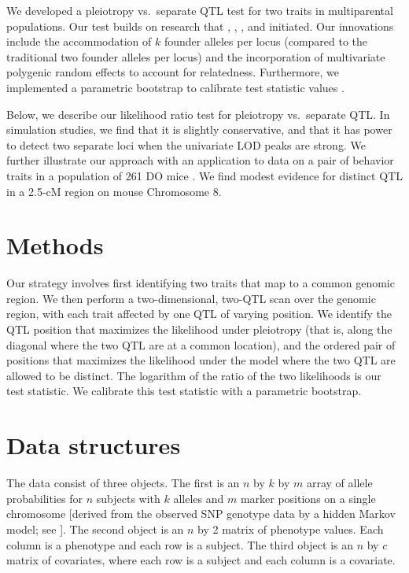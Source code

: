 \documentclass[oneside]{book}\usepackage[]{graphicx}\usepackage[]{color}
\begin{document}
We developed a pleiotropy vs.\ separate QTL test for two traits in
multiparental populations. Our test builds on research that
\citet{jiang1995multiple}, \citet{knott2000multitrait},
\citet{tian2016dissection}, and \citet{zhou2014efficient} initiated.
Our innovations include the accommodation of $k$ founder alleles per
locus (compared to the traditional two founder alleles per locus) and
the incorporation of multivariate polygenic random effects to account
for relatedness. Furthermore, we implemented a parametric bootstrap to
calibrate test statistic values \citep{efron1979,tian2016dissection}.

Below, we describe our likelihood ratio test for pleiotropy vs.\
separate QTL. In simulation studies, we find that it is slightly
conservative, and that it has power to detect two separate loci when
the univariate LOD peaks are strong. We further illustrate our
approach with an application to data on a pair of behavior traits in
a population of 261 DO mice \citep{logan2013high,recla2014precise}.
We find modest evidence for distinct QTL in a 2.5-cM region on mouse
Chromosome 8.


\section{Methods}
\label{sec:materials:methods}

Our strategy involves first identifying two traits that map to a common
genomic region. We then perform a two-dimensional, two-QTL scan over
the genomic region, with each trait affected by one QTL of varying
position. We identify the QTL position that maximizes the likelihood
under pleiotropy (that is, along the diagonal where the two QTL are at
a common location), and the ordered pair of positions that maximizes
the likelihood under the model where the two QTL are allowed to be
distinct. The logarithm of the ratio of the two likelihoods is our
test statistic. We calibrate this test statistic with a parametric
bootstrap.

\section{Data structures}

The data consist of three objects. The first is an $n$ by $k$ by $m$
array of allele probabilities for $n$ subjects with $k$ alleles and
$m$ marker positions on a single chromosome [derived from the observed
SNP genotype data by a hidden Markov model; see
\citet{broman2019rqtl2}]. The second object is an $n$ by 2 matrix of
phenotype values. Each column is a phenotype and each row is a
subject. The third object is an $n$ by $c$ matrix of covariates, where
each row is a subject and each column is a covariate.
\end{document}
